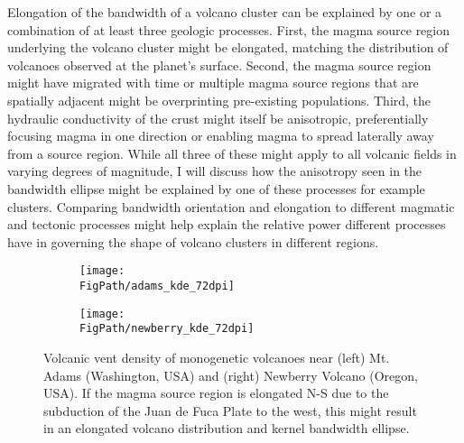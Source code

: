 Elongation of the bandwidth of a volcano cluster can be explained by one or a combination of at least three geologic processes. First, the magma source region underlying the volcano cluster might be elongated, matching the distribution of volcanoes observed at the planet's surface. Second, the magma source region might have migrated with time or multiple magma source regions that are spatially adjacent might be overprinting pre-existing populations. Third, the hydraulic conductivity of the crust might itself be anisotropic, preferentially focusing magma in one direction or enabling magma to spread laterally away from a source region. While all three of these might apply to all volcanic fields in varying degrees of magnitude, I will discuss how the anisotropy seen in the bandwidth ellipse might be explained by one of these processes for example clusters. Comparing bandwidth orientation and elongation to different magmatic and tectonic processes might help explain the relative power different processes have in governing the shape of volcano clusters in different regions.

\begin{figure}
\centering
\begin{subfigure}{0.49\textwidth}
\centering
\texttt{[image: \\FigPath/adams\_kde\_72dpi]}
\end{subfigure}
\begin{subfigure}{0.49\textwidth}
\centering
\texttt{[image: \\FigPath/newberry\_kde\_72dpi]}
\end{subfigure}
\caption[Volcanic vent density of monogenetic volcanoes near Mt. Adams (Washington, USA) and Newberry Volcano (Oregon, USA)]{Volcanic vent density of monogenetic volcanoes near (left) Mt. Adams (Washington, USA) and (right) Newberry Volcano (Oregon, USA). If the magma source region is elongated N-S due to the subduction of the Juan de Fuca Plate to the west, this might result in an elongated volcano distribution and kernel bandwidth ellipse.}
\label{fig_adams-newbkde}
\end{figure}

